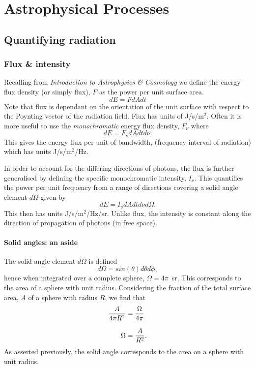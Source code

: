 \chapter{Astrophysical Processes}
\minitoc
\pagebreak
\section{Quantifying radiation}
\subsection{Flux \& intensity}
Recalling from \textit{Introduction to Astrophysics \& Cosmology} we define the energy flux density (or simply flux), $F$ as the power per unit surface area.
%
$$ dE = F dA dt $$
%
Note that flux is dependant on the orientation of the unit surface with respect to the Poynting vector of the radiation field.
 Flux has units of J/s/m$^2$.
 Often it is more useful to use the \emph{monochromatic} energy flux density, $F_\nu$ where
%
$$ dE = F_\nu dA dt d\nu. $$
%
This gives the energy flux per unit of bandwidth, (frequency interval of radiation) which has units J/s/m$^2$/Hz.
\par 
In order to account for the differing directions of photons, the flux is further generalised by defining the specific monochromatic intensity, $I_\nu$.
 This quantifies the power per unit frequency from a range of directions covering a solid angle element $d\Omega$ given by
%
$$ dE = I_\nu dA dt d\nu d\Omega. $$
%
This then has units J/s/m$^2$/Hz/sr.
 Unlike flux, the intensity is constant along the direction of propagation of photons (in free space).
 
\subsubsection{Solid angles: an aside}
The solid angle element $d\Omega$ is defined
%
$$ d\Omega = sin(\theta) d\theta d\phi , $$
%
hence when integrated over a complete sphere, $\Omega = 4\pi$~sr.
 This corresponds to the area of a sphere with unit radius.
 Considering the fraction of the total surface area, $A$ of a sphere with radius $R$, we find that
%
\begin{align*}
	\frac{A}{4\pi R^2} &= \frac{\Omega}{4\pi}
	\\[0.5\baselineskip]
	\Omega &= \frac{A}{R^2}.
\end{align*}
%
As asserted previously, the solid angle corresponds to the area on a sphere with unit radius.

 
 
 
 
 
 
 
 
 
 
 
 